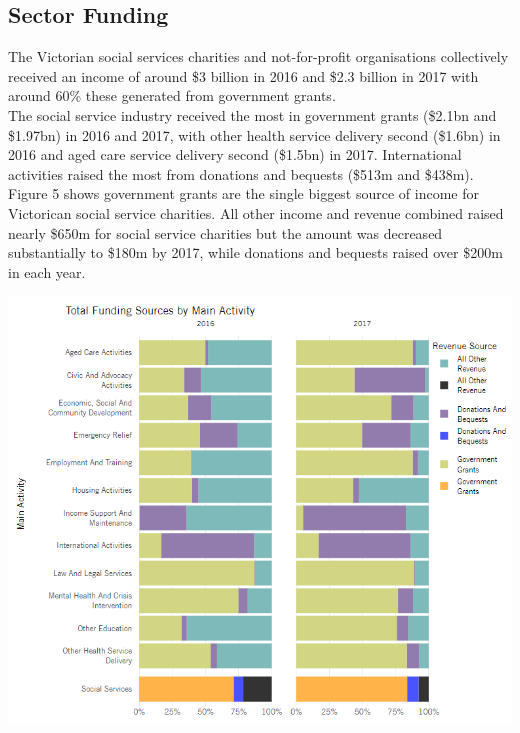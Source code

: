 \documentclass[
  11pt,
]{article}
\let\origfigure\figure
\let\endorigfigure\endfigure
\renewenvironment{figure}[1][2] {
    \expandafter\origfigure\expandafter[H]
} {
    \endorigfigure
}
\begin{document}
\hypertarget{sector-funding}{%
\subsection{Sector Funding}\label{sector-funding}}

The Victorian social services charities and not-for-profit organisations collectively received an income of around \$3 billion in 2016 and
\$2.3 billion in 2017 with around 60\% these generated from government grants.\\
The social service industry received the most in government grants (\$2.1bn and \$1.97bn) in 2016 and 2017, with other health service delivery second (\$1.6bn) in 2016 and aged care service delivery second (\$1.5bn) in 2017. International activities raised the most from donations and bequests (\$513m and \$438m).\\
Figure 5 shows government grants are the single biggest source of income for Victorican social service charities. All other income and revenue combined raised nearly \$650m for social service charities but the amount was decreased substantially to \$180m by 2017, while donations and bequests raised over \$200m in each year.

\begin{figure}
\centering
\includegraphics{Fig5 Funding Props.PNG}
\caption{Proportion of Funding Sources per Main Activity}
\end{figure}
\end{document}
